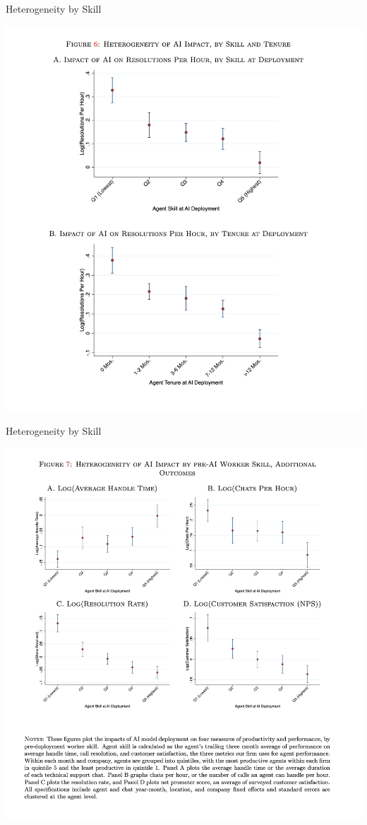 \documentclass{beamer}
\begin{document}
\begin{frame}{Heterogeneity by Skill}
\begin{center}
\includegraphics[scale=0.25]{./lecture_includes/brynn5}
\end{center}
\end{frame}


\begin{frame}{Heterogeneity by Skill}
\begin{center}
\includegraphics[scale=0.25]{./lecture_includes/brynn6}
\end{center}
\end{frame}
\end{document}
